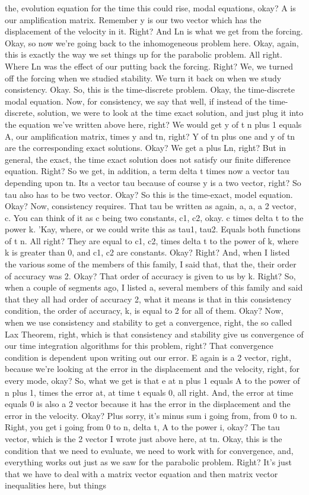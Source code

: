 \documentclass[10pt]{article}
\begin{document}
the, evolution equation for the time this could rise, modal equations, okay? A is our amplification matrix. Remember y is our two vector which has the displacement of the velocity in it. Right? And Ln is what we get from the forcing. Okay, so now we're going back to the inhomogeneous problem here. Okay, again, this is exactly the way we set things up for the parabolic problem. All right. Where Ln was the effect of our putting back the forcing. Right? We, we turned off the forcing when we studied stability. We turn it back on when we study consistency. Okay. So, this is the time-discrete problem. Okay, the time-discrete modal equation. Now, for consistency, we say that well, if instead of the time-discrete, solution, we were to look at the time exact solution, and just plug it into the equation we've written above here, right? We would get y of t n plus 1 equals A, our amplification matrix, times y and tn, right? Y of tn plus one and y of tn are the corresponding exact solutions. Okay? We get a plus Ln, right? But in general, the exact, the time exact solution does not satisfy our finite difference equation. Right? So we get, in addition, a term delta t times now a vector tau depending upon tn. Its a vector tau because of course y is a two vector, right? So tau also has to be two vector. Okay? So this is the time-exact, model equation. Okay? Now, consistency requires. That tau be written as again, a, a, a 2 vector, c. You can think of it as c being two constants, c1, c2, okay. c times delta t to the power k. 'Kay, where, or we could write this as tau1, tau2. Equals both functions of t n. All right? They are equal to c1, c2, times delta t to the power of k, where k is greater than 0, and c1, c2 are constants. Okay? Right? And, when I listed the various some of the members of this family, I said that, that the, their order of accuracy was 2. Okay? That order of accuracy is given to us by k. Right? So, when a couple of segments ago, I listed a, several members of this family and said that they all had order of accuracy 2, what it means is that in this consistency condition, the order of accuracy, k, is equal to 2 for all of them. Okay? Now, when we use consistency and stability to get a convergence, right, the so called Lax Theorem, right, which is that consistency and stability give us convergence of our time integration algorithms for this problem, right? That convergence condition is dependent upon writing out our error. E again is a 2 vector, right, because we're looking at the error in the displacement and the velocity, right, for every mode, okay? So, what we get is that e at n plus 1 equals A to the power of n plus 1, times the error at, at time t equals 0, all right. And, the error at time equals 0 is also a 2 vector because it has the error in the displacement and the error in the velocity. Okay? Plus sorry, it's minus sum i going from, from 0 to n. Right, you get i going from 0 to n, delta t, A to the power i, okay? The tau vector, which is the 2 vector I wrote just above here, at tn. Okay, this is the condition that we need to evaluate, we need to work with for convergence, and, everything works out just as we saw for the parabolic problem. Right? It's just that we have to deal with a matrix vector equation and then matrix vector inequalities here, but things 
\end{document}
